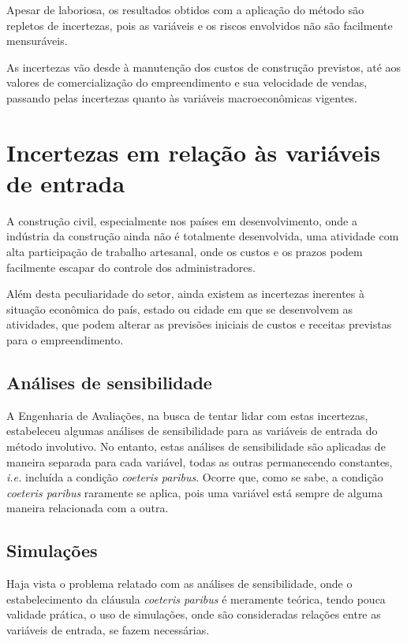 \documentclass[
	12pt,				%
	oneside,			%
	a4paper,			%
	chapter=TITLE,		%
	section=TITLE,		%
	english,			%
	brazil				%
	]{abntex2}
\begin{document}
Apesar de laboriosa, os resultados obtidos com a aplicação do método são
repletos de incertezas, pois as variáveis e os riscos envolvidos não são
facilmente mensuráveis.

As incertezas vão desde à manutenção dos custos de construção previstos,
até aos valores de comercialização do empreendimento e sua velocidade de
vendas, passando pelas incertezas quanto às variáveis macroeconômicas
vigentes.

\section{Incertezas em relação às variáveis de
entrada}\label{incertezas-em-relauxe7uxe3o-uxe0s-variuxe1veis-de-entrada}

A construção civil, especialmente nos países em desenvolvimento, onde a
indústria da construção ainda não é totalmente desenvolvida, uma
atividade com alta participação de trabalho artesanal, onde os custos e
os prazos podem facilmente escapar do controle dos administradores.

Além desta peculiaridade do setor, ainda existem as incertezas inerentes
à situação econômica do país, estado ou cidade em que se desenvolvem as
atividades, que podem alterar as previsões iniciais de custos e receitas
previstas para o empreendimento.

\subsection{Análises de
sensibilidade}\label{anuxe1lises-de-sensibilidade}

A Engenharia de Avaliações, na busca de tentar lidar com estas
incertezas, estabeleceu algumas análises de sensibilidade para as
variáveis de entrada do método involutivo. No entanto, estas análises de
sensibilidade são aplicadas de maneira separada para cada variável,
todas as outras permanecendo constantes, \emph{i.e.} incluída a condição
\emph{coeteris paribus}. Ocorre que, como se sabe, a condição
\emph{coeteris paribus} raramente se aplica, pois uma variável está
sempre de alguma maneira relacionada com a outra.

\subsection{Simulações}\label{simulauxe7uxf5es}

Haja vista o problema relatado com as análises de sensibilidade, onde o
estabelecimento da cláusula \emph{coeteris paribus} é meramente teórica,
tendo pouca validade prática, o uso de simulações, onde são consideradas
relações entre as variáveis de entrada, se fazem necessárias.
\end{document}
